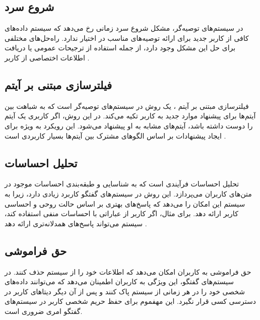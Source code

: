 \subsection{شروع سرد}

در سیستم‌های توصیه‌گر، مشکل 
شروع سرد%
 زمانی رخ می‌دهد که سیستم داده‌های کافی از کاربر جدید برای ارائه توصیه‌های مناسب در اختیار ندارد. راه‌حل‌های مختلفی برای حل این مشکل وجود دارد، از جمله استفاده از ترجیحات عمومی یا دریافت اطلاعات اختصاصی از کاربر %
\cite{yuan2023user}
.

\subsection{فیلترسازی مبتنی بر آیتم} 
فیلترسازی مبتنی بر آیتم%
، یک روش در سیستم‌های توصیه‌گر است که به شباهت بین آیتم‌ها برای پیشنهاد موارد جدید به کاربر تکیه می‌کند. در این روش، اگر کاربری یک آیتم را دوست داشته باشد، آیتم‌های مشابه به او پیشنهاد می‌شود. این رویکرد به ویژه برای ایجاد پیشنهادات بر اساس الگوهای مشترک بین آیتم‌ها بسیار کاربردی است %
\cite{abdalla2023boosting}
.

\subsection{تحلیل احساسات}
تحلیل احساسات%
 فرآیندی است که به شناسایی و طبقه‌بندی احساسات موجود در متن‌های کاربران می‌پردازد. این روش در سیستم‌های گفتگو کاربرد زیادی دارد، زیرا به سیستم این امکان را می‌دهد که پاسخ‌های بهتری بر اساس حالت روحی و احساسی کاربر ارائه دهد. برای مثال، اگر کاربر از عباراتی با احساسات منفی استفاده کند، سیستم می‌تواند پاسخ‌های همدلانه‌تری ارائه دهد %
\cite{pandelea2024towards}
.


\subsection{حق فراموشی}

حق فراموشی%
به کاربران امکان می‌دهد که اطلاعات خود را از سیستم حذف کنند. در سیستم‌های گفتگو، این ویژگی به کاربران اطمینان می‌دهد که می‌توانند داده‌های شخصی خود را در هر زمانی از سیستم پاک کنند و پس از آن دیگر دیتاهای کاربر در دسترسی کسی قرار نگیرد.%
\cite{zhang2024right}
 این مهفموم برای حفظ حریم شخصی کاربر در سیستم‌های گفتگو امری ضروری است.

